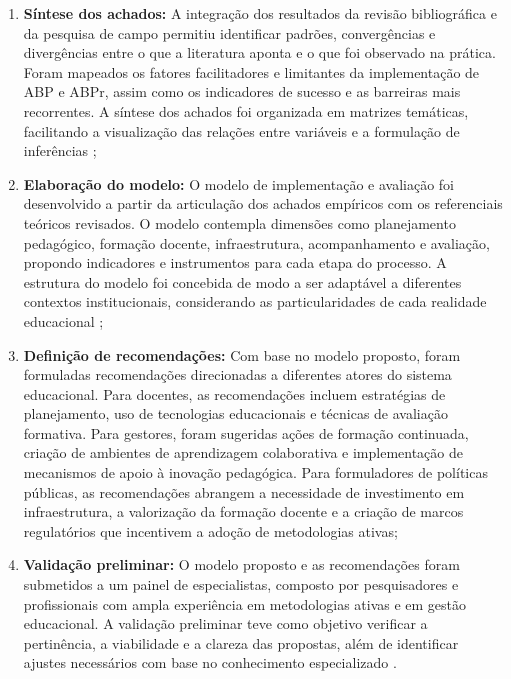 \begin{enumerate}
    \item \textbf{Síntese dos achados:} A integração dos resultados da revisão bibliográfica e da pesquisa de campo permitiu identificar padrões, convergências e divergências entre o que a literatura aponta e o que foi observado na prática. Foram mapeados os fatores facilitadores e limitantes da implementação de ABP e ABPr, assim como os indicadores de sucesso e as barreiras mais recorrentes. A síntese dos achados foi organizada em matrizes temáticas, facilitando a visualização das relações entre variáveis e a formulação de inferências \cite{CRESWELL2018};
    \item \textbf{Elaboração do modelo:} O modelo de implementação e avaliação foi desenvolvido a partir da articulação dos achados empíricos com os referenciais teóricos revisados. O modelo contempla dimensões como planejamento pedagógico, formação docente, infraestrutura, acompanhamento e avaliação, propondo indicadores e instrumentos para cada etapa do processo. A estrutura do modelo foi concebida de modo a ser adaptável a diferentes contextos institucionais, considerando as particularidades de cada realidade educacional \cite{SANTOS2024};
    \item \textbf{Definição de recomendações:} Com base no modelo proposto, foram formuladas recomendações direcionadas a diferentes atores do sistema educacional. Para docentes, as recomendações incluem estratégias de planejamento, uso de tecnologias educacionais e técnicas de avaliação formativa. Para gestores, foram sugeridas ações de formação continuada, criação de ambientes de aprendizagem colaborativa e implementação de mecanismos de apoio à inovação pedagógica. Para formuladores de políticas públicas, as recomendações abrangem a necessidade de investimento em infraestrutura, a valorização da formação docente e a criação de marcos regulatórios que incentivem a adoção de metodologias ativas;
    \item \textbf{Validação preliminar:} O modelo proposto e as recomendações foram submetidos a um painel de especialistas, composto por pesquisadores e profissionais com ampla experiência em metodologias ativas e em gestão educacional. A validação preliminar teve como objetivo verificar a pertinência, a viabilidade e a clareza das propostas, além de identificar ajustes necessários com base no conhecimento especializado \cite{BARDIN2016}.
\end{enumerate}

